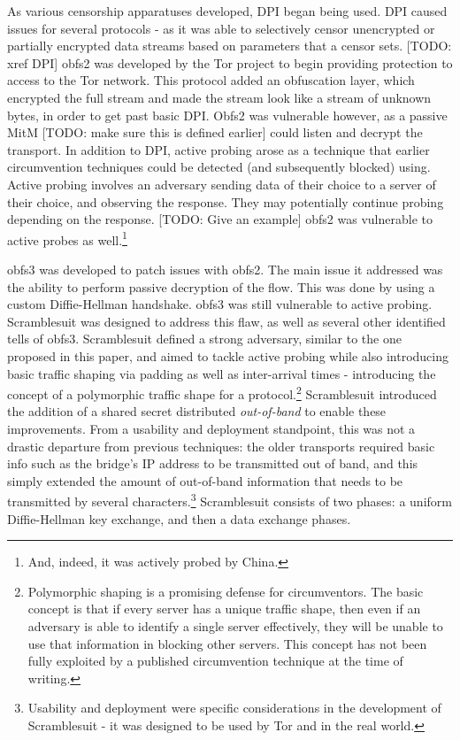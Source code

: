 \documentclass[12pt]{report}
\begin{document}
As various censorship apparatuses developed, DPI began being used. DPI caused issues for several protocols - as it was able to selectively censor unencrypted or partially encrypted data streams based on parameters that a censor sets. [TODO: xref DPI] obfs2 was developed by the Tor project to begin providing protection to access to the Tor network.\cite{obfs2} This protocol added an obfuscation layer, which encrypted the full stream and made the stream look like a stream of unknown bytes, in order to get past basic DPI. Obfs2 was vulnerable however, as a passive MitM [TODO: make sure this is defined earlier] could listen and decrypt the transport.\cite{obfs3} In addition to DPI, active probing arose as a technique that earlier circumvention techniques could be detected (and subsequently blocked) using. Active probing involves an adversary sending data of their choice to a server of their choice, and observing the response. They may potentially continue probing depending on the response. [TODO: Give an example] obfs2 was vulnerable to active probes as well.\footnote{And, indeed, it was actively probed by China.\cite{TODO https://gitlab.torproject.org/legacy/trac/-/issues/8591}}

obfs3 was developed to patch issues with obfs2. The main issue it addressed was the ability to perform passive decryption of the flow. This was done by using a custom Diffie-Hellman handshake.\cite{obfs3} obfs3 was still vulnerable to active probing.\cite{scramblesuit} Scramblesuit was designed to address this flaw, as well as several other identified tells of obfs3.\cite{scramblesuit} Scramblesuit defined a strong adversary, similar to the one proposed in this paper, and aimed to tackle active probing while also introducing basic traffic shaping via padding as well as inter-arrival times - introducing the concept of a polymorphic traffic shape for a protocol.\footnote{Polymorphic shaping is a promising defense for circumventors. The basic concept is that if every server has a unique traffic shape, then even if an adversary is able to identify a single server effectively, they will be unable to use that information in blocking other servers. This concept has not been fully exploited by a published circumvention technique at the time of writing.} Scramblesuit introduced the addition of a shared secret distributed \emph{out-of-band} to enable these improvements. From a usability and deployment standpoint, this was not a drastic departure from previous techniques: the older transports required basic info such as the bridge's IP address to be transmitted out of band, and this simply extended the amount of out-of-band information that needs to be transmitted by several characters.\footnote{Usability and deployment were specific considerations in the development of Scramblesuit - it was designed to be used by Tor and in the real world.\cite{scramblesuit}} Scramblesuit consists of two phases: a uniform Diffie-Hellman key exchange, and then a data exchange phases.
\end{document}
